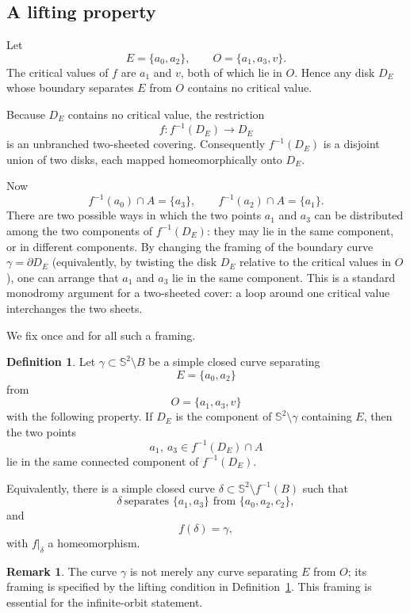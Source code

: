 \documentclass[11pt]{article}
\theoremstyle{plain}
\theoremstyle{definition}
\newtheorem{definition}[theorem]{Definition}
\newtheorem{remark}[theorem]{Remark}
\newcommand{\Sph}{\mathbb S^2}
\begin{document}
\subsection{A lifting property}

Let
\[
E=\{a_0,a_2\},\qquad O=\{a_1,a_3,v\}.
\]
The critical values of \(f\) are \(a_1\) and \(v\), both of which lie in \(O\). Hence any disk \(D_E\) whose boundary separates \(E\) from \(O\) contains no critical value.

Because \(D_E\) contains no critical value, the restriction
\[
f:f^{-1}(D_E)\longrightarrow D_E
\]
is an unbranched two-sheeted covering. Consequently \(f^{-1}(D_E)\) is a disjoint union of two disks, each mapped homeomorphically onto \(D_E\).

Now
\[
f^{-1}(a_0)\cap A=\{a_3\},\qquad f^{-1}(a_2)\cap A=\{a_1\}.
\]
There are two possible ways in which the two points \(a_1\) and \(a_3\) can be distributed among the two components of \(f^{-1}(D_E)\): they may lie in the same component, or in different components. By changing the framing of the boundary curve \(\gamma=\partial D_E\) (equivalently, by twisting the disk \(D_E\) relative to the critical values in \(O\)), one can arrange that \(a_1\) and \(a_3\) lie in the same component. This is a standard monodromy argument for a two-sheeted cover: a loop around one critical value interchanges the two sheets.

We fix once and for all such a framing.

\begin{definition}\label{def:gamma}
Let \(\gamma\subset\Sph\setminus B\) be a simple closed curve separating
\[
E=\{a_0,a_2\}
\]
from
\[
O=\{a_1,a_3,v\}
\]
with the following property. If \(D_E\) is the component of \(\Sph\setminus\gamma\) containing \(E\), then the two points
\[
a_1,\ a_3\in f^{-1}(D_E)\cap A
\]
lie in the same connected component of \(f^{-1}(D_E)\).

Equivalently, there is a simple closed curve \(\delta\subset\Sph\setminus f^{-1}(B)\) such that
\[
\delta\ \text{separates }\{a_1,a_3\}\text{ from }\{a_0,a_2,c_2\},
\]
and
\[
f(\delta)=\gamma,
\]
with \(f|_{\delta}\) a homeomorphism.
\end{definition}

\begin{remark}
The curve \(\gamma\) is not merely any curve separating \(E\) from \(O\); its framing is specified by the lifting condition in Definition~\ref{def:gamma}. This framing is essential for the infinite-orbit statement.
\end{remark}
\end{document}
